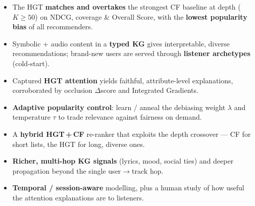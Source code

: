 \documentclass[a1paper, 14pt]{extarticle}
\newcommand{\fcap}[1]{{\LARGE\itshape #1}}
\begin{document}
\begin{minipage}[t]{0.48\textwidth}
  \begin{tcolorbox}[posterbox, title=Conclusions \& Future Work]
    \begin{itemize}
      \item The HGT \textbf{matches and overtakes} the strongest CF baseline at depth ($K\geq50$) on NDCG, coverage \& Overall Score, with the \textbf{lowest popularity bias} of all recommenders.
      \item Symbolic + audio content in a \textbf{typed KG} gives interpretable, diverse recommendations; brand-new users are served through \textbf{listener archetypes} (cold-start).
      \item Captured \textbf{HGT attention} yields faithful, attribute-level explanations, corroborated by occlusion $\Delta$score and Integrated Gradients.
    \end{itemize}
    \begin{itemize}
      \item \textbf{Adaptive popularity control}: learn / anneal the debiasing weight $\lambda$ and temperature $\tau$ to trade relevance against fairness on demand.
      \item A \textbf{hybrid HGT\,+\,CF} re-ranker that exploits the depth crossover — CF for short lists, the HGT for long, diverse ones.
      \item \textbf{Richer, multi-hop KG signals} (lyrics, mood, social ties) and deeper propagation beyond the single user$\to$track hop.
      \item \textbf{Temporal / session-aware} modelling, plus a human study of how useful the attention explanations are to listeners.
    \end{itemize}
  \end{tcolorbox}

  

\end{minipage}
\end{document}
